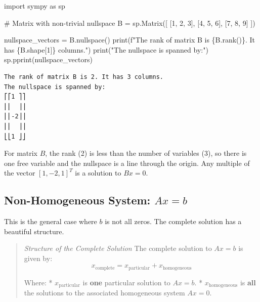 \documentclass[
  letterpaper,
  DIV=11,
  numbers=noendperiod]{scrreprt}
\newenvironment{Shaded}{\begin{snugshade}}{\end{snugshade}}
\newcommand{\BuiltInTok}[1]{\textcolor[rgb]{0.00,0.23,0.31}{#1}}
\newcommand{\CommentTok}[1]{\textcolor[rgb]{0.37,0.37,0.37}{#1}}
\newcommand{\DecValTok}[1]{\textcolor[rgb]{0.68,0.00,0.00}{#1}}
\newcommand{\ImportTok}[1]{\textcolor[rgb]{0.00,0.46,0.62}{#1}}
\newcommand{\NormalTok}[1]{\textcolor[rgb]{0.00,0.23,0.31}{#1}}
\newcommand{\OperatorTok}[1]{\textcolor[rgb]{0.37,0.37,0.37}{#1}}
\newcommand{\SpecialCharTok}[1]{\textcolor[rgb]{0.37,0.37,0.37}{#1}}
\newcommand{\SpecialStringTok}[1]{\textcolor[rgb]{0.13,0.47,0.30}{#1}}
\newcommand{\StringTok}[1]{\textcolor[rgb]{0.13,0.47,0.30}{#1}}
\begin{document}
\label{sympy-nullspace}
\begin{Shaded}
\begin{Highlighting}[]
\ImportTok{import}\NormalTok{ sympy }\ImportTok{as}\NormalTok{ sp}

\CommentTok{\# Matrix with non{-}trivial nullspace}
\NormalTok{B }\OperatorTok{=}\NormalTok{ sp.Matrix([}
\NormalTok{  [}\DecValTok{1}\NormalTok{, }\DecValTok{2}\NormalTok{, }\DecValTok{3}\NormalTok{],}
\NormalTok{  [}\DecValTok{4}\NormalTok{, }\DecValTok{5}\NormalTok{, }\DecValTok{6}\NormalTok{],}
\NormalTok{  [}\DecValTok{7}\NormalTok{, }\DecValTok{8}\NormalTok{, }\DecValTok{9}\NormalTok{]}
\NormalTok{])}

\NormalTok{nullspace\_vectors }\OperatorTok{=}\NormalTok{ B.nullspace()}
\BuiltInTok{print}\NormalTok{(}\SpecialStringTok{f"The rank of matrix B is }\SpecialCharTok{\{}\NormalTok{B}\SpecialCharTok{.}\NormalTok{rank()}\SpecialCharTok{\}}\SpecialStringTok{. It has }\SpecialCharTok{\{}\NormalTok{B}\SpecialCharTok{.}\NormalTok{shape[}\DecValTok{1}\NormalTok{]}\SpecialCharTok{\}}\SpecialStringTok{ columns."}\NormalTok{)}
\BuiltInTok{print}\NormalTok{(}\StringTok{"The nullspace is spanned by:"}\NormalTok{)}
\NormalTok{sp.pprint(nullspace\_vectors)}
\end{Highlighting}
\end{Shaded}

\begin{verbatim}
The rank of matrix B is 2. It has 3 columns.
The nullspace is spanned by:
⎡⎡1 ⎤⎤
⎢⎢  ⎥⎥
⎢⎢-2⎥⎥
⎢⎢  ⎥⎥
⎣⎣1 ⎦⎦
\end{verbatim}

For matrix \(B\), the rank (2) is less than the number of variables (3),
so there is one free variable and the nullspace is a line through the
origin. Any multiple of the vector \([1, -2, 1]^T\) is a solution to
\(Bx=0\).

\subsection{\texorpdfstring{Non-Homogeneous System:
\(Ax = b\)}{Non-Homogeneous System: Ax = b}}\label{non-homogeneous-system-ax-b}

This is the general case where \(b\) is not all zeros. The complete
solution has a beautiful structure.

\begin{quote}
\emph{Structure of the Complete Solution} The complete solution to
\(Ax = b\) is given by:
\[ x_{\text{complete}} = x_{\text{particular}} + x_{\text{homogeneous}} \]

Where: * \(x_{\text{particular}}\) is \textbf{one} particular solution
to \(Ax = b\). * \(x_{\text{homogeneous}}\) is \textbf{all} the
solutions to the associated homogeneous system \(Ax = 0\).
\end{quote}
\end{document}
